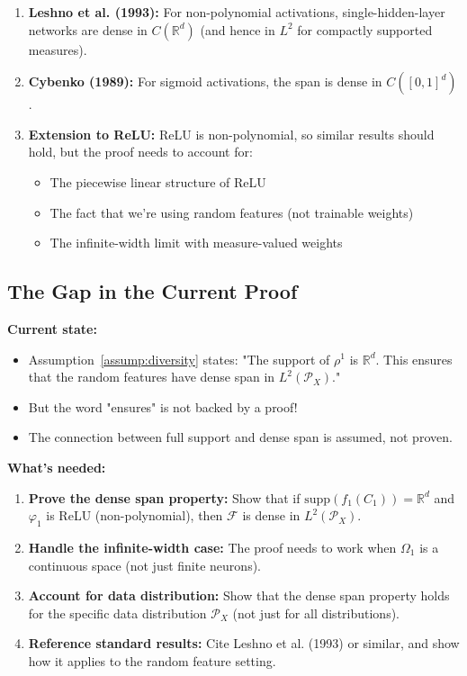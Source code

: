\begin{enumerate}
\item \textbf{Leshno et al. (1993):} For non-polynomial activations, single-hidden-layer networks are dense in $C(\mathbb{R}^d)$ (and hence in $L^2$ for compactly supported measures).

\item \textbf{Cybenko (1989):} For sigmoid activations, the span is dense in $C([0,1]^d)$.

\item \textbf{Extension to ReLU:} ReLU is non-polynomial, so similar results should hold, but the proof needs to account for:
\begin{itemize}
\item The piecewise linear structure of ReLU
\item The fact that we're using random features (not trainable weights)
\item The infinite-width limit with measure-valued weights
\end{itemize}
\end{enumerate}

\subsection{The Gap in the Current Proof}

\textbf{Current state:}
\begin{itemize}
\item Assumption~\ref{assump:diversity} states: "The support of $\rho^1$ is $\mathbb{R}^d$. This ensures that the random features have dense span in $L^2(\mathcal{P}_X)$."
\item But the word "ensures" is not backed by a proof!
\item The connection between full support and dense span is assumed, not proven.
\end{itemize}

\textbf{What's needed:}
\begin{enumerate}
\item \textbf{Prove the dense span property:} Show that if $\text{supp}(f_1(C_1)) = \mathbb{R}^d$ and $\varphi_1$ is ReLU (non-polynomial), then $\mathcal{F}$ is dense in $L^2(\mathcal{P}_X)$.

\item \textbf{Handle the infinite-width case:} The proof needs to work when $\Omega_1$ is a continuous space (not just finite neurons).

\item \textbf{Account for data distribution:} Show that the dense span property holds for the specific data distribution $\mathcal{P}_X$ (not just for all distributions).

\item \textbf{Reference standard results:} Cite Leshno et al. (1993) or similar, and show how it applies to the random feature setting.
\end{enumerate}


